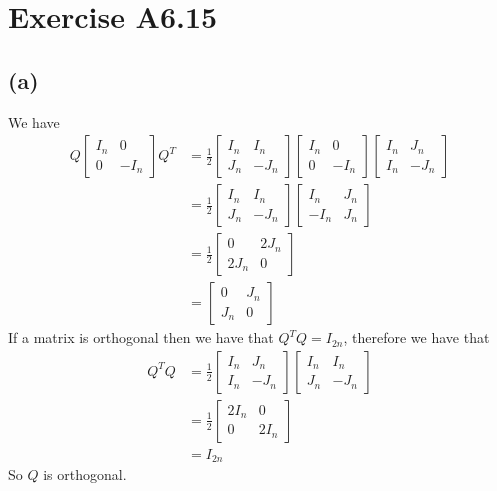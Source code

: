 \section*{Exercise A6.15}
\subsection*{(a)}
We have
\begin{align*}
    Q\begin{bmatrix}
        I_n & 0\\
        0 & -I_n
    \end{bmatrix}Q^T&=\frac{1}{2}
    \begin{bmatrix}
        I_n & I_n\\
        J_n & -J_n
    \end{bmatrix}
    \begin{bmatrix}
        I_n & 0\\
        0 & -I_n
    \end{bmatrix}
    \begin{bmatrix}
        I_n & J_n\\
        I_n & -J_n
    \end{bmatrix}\\
    &=\frac{1}{2}
    \begin{bmatrix}
        I_n & I_n\\
        J_n & -J_n
    \end{bmatrix}
    \begin{bmatrix}
        I_n & J_n\\
        -I_n & J_n
    \end{bmatrix}\\
    &=\frac{1}{2}
    \begin{bmatrix}
        0 & 2J_n\\
        2J_n & 0
    \end{bmatrix}\\
    &=\begin{bmatrix}
        0 & J_n\\
        J_n & 0
    \end{bmatrix}
\end{align*}
If a matrix is orthogonal then we have that $Q^TQ=I_{2n}$, therefore we have that
\begin{align*}
    Q^TQ&=\frac{1}{2}\begin{bmatrix}
        I_n & J_n\\
        I_n & -J_n
    \end{bmatrix}
    \begin{bmatrix}
        I_n & I_n\\
        J_n & -J_n
    \end{bmatrix}\\
    &=\frac{1}{2}\begin{bmatrix}
        2I_n & 0\\
        0 & 2I_n
    \end{bmatrix}\\
    &=I_{2n}
\end{align*}
So $Q$ is orthogonal.
